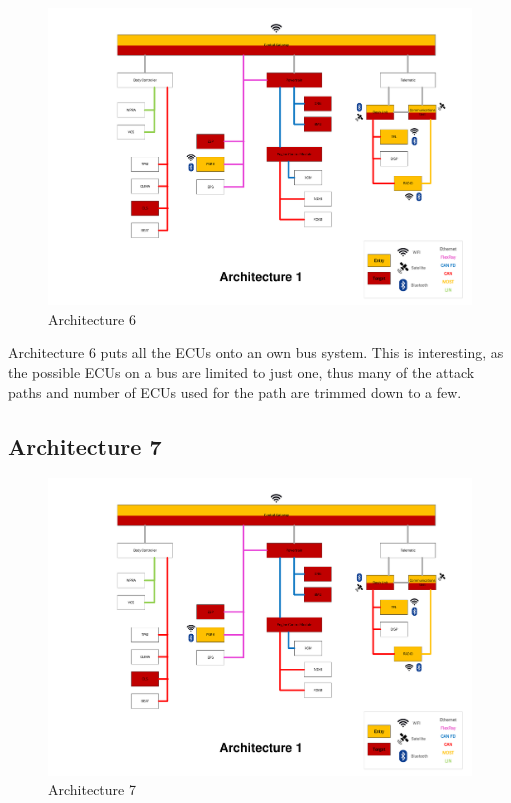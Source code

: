 \begin{figure}[h!]
    \caption{Architecture 6}
    \includegraphics[width=\textwidth, page=6]{../Architectures-survey.pdf}
\end{figure}

Architecture 6 puts all the ECUs onto an own bus system.
This is interesting, as the possible ECUs on a bus are limited to just one, thus many of the attack paths and number of ECUs used for the path are trimmed down to a few.
\par


\subsection*{Architecture 7}
\label{sec:arch7}

\begin{figure}[h!]
    \caption{Architecture 7}
    \includegraphics[width=\textwidth, page=7]{../Architectures-survey.pdf}
\end{figure}

